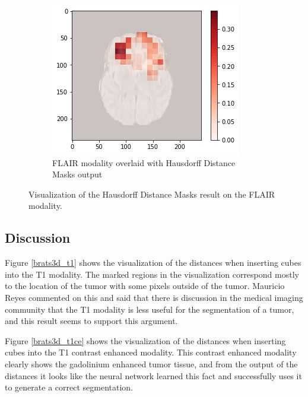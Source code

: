 \begin{figure}[H]
\begin{subfigure}[t]{.315\textwidth}
    \end{subfigure}\hfill%
    \begin{subfigure}[t]{.315\textwidth}
        \centering
        \includegraphics[width=\linewidth]{chapters/07_brats3d/images/12_flair_hdm.png}
        \caption{FLAIR modality overlaid with Hausdorff Distance Masks output}
    \end{subfigure}
    \caption{Visualization of the Hausdorff Distance Masks result on the FLAIR modality.}
    \label{brats3d_flair}
\end{figure}

\subsection{Discussion}
Figure \ref{brats3d_t1} shows the visualization of the distances when inserting cubes into the T1 modality. The marked regions in the visualization correspond mostly to the location of the tumor with some pixels outside of the tumor. Mauricio Reyes commented on this and said that there is discussion in the medical imaging community that the T1 modality is less useful for the segmentation of a tumor, and this result seems to support this argument.

Figure \ref{brats3d_t1ce} shows the visualization of the distances when inserting cubes into the T1 contrast enhanced modality. This contrast enhanced modality clearly shows the gadolinium enhanced tumor tissue, and from the output of the distances it looks like the neural network learned this fact and successfully uses it to generate a correct segmentation.

